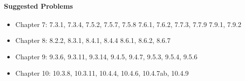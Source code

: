 \paragraph*{Suggested Problems}
\begin{itemize}
  \item Chapter 7: 7.3.1, 7.3.4, 7.5.2, 7.5.7, 7.5.8 7.6.1, 7.6.2, 7.7.3, 7.7.9 7.9.1, 7.9.2
  \item Chapter 8: 8.2.2, 8.3.1, 8.4.1, 8.4.4 8.6.1, 8.6.2, 8.6.7
  \item Chapter 9: 9.3.6, 9.3.11, 9.3.14, 9.4.5, 9.4.7, 9.5.3, 9.5.4, 9.5.6
  \item Chapter 10: 10.3.8, 10.3.11, 10.4.4, 10.4.6, 10.4.7ab, 10.4.9
\end{itemize}



